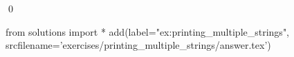 
\begin{ex} 
  \label{ex:printing_multiple_strings}
  
  \qed
\end{ex} 
\begin{python0}
from solutions import *
add(label="ex:printing_multiple_strings",
    srcfilename='exercises/printing_multiple_strings/answer.tex') 
\end{python0}

